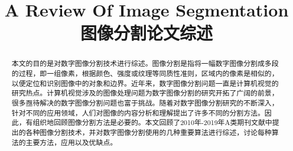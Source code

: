 \documentclass[conference]{IEEEtran}
\begin{document}
%
\title{A Review Of Image Segmentation\\图像分割论文综述}



\author{
}



\maketitle

\begin{abstract}
本文的目的是对数字图像分割技术进行综述。图像分割是指将一幅数字图像分割成多段的过程，即一组像素，根据颜色、强度或纹理等同质性准则，区域内的像素是相似的，以便定位和识别图像中的对象和边界。近年来，数字图像分割问题一直是计算机视觉的研究热点。计算机视觉涉及的图像处理问题为数字图像分割的研究开拓了广阔的前景，很多亟待解决的数字图像分割问题也富于挑战。随着对数字图像分割研究的不断深入，针对不同的应用领域，人们对图像的内容分析和理解提出了许多不同的分割方法。因此，有组织地回顾图像分割方法是必要的。本文回顾了2010年-2019年A类期刊文献中提出的各种图像分割技术，并对数字图像分割使用的几种重要算法进行综述，讨论每种算法的主要方法，应用以及优缺点。
\end{abstract}





%
\IEEEpeerreviewmaketitle
\end{document}
